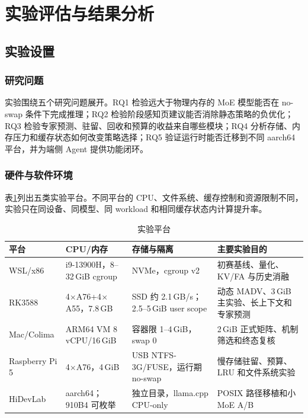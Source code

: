 \section{实验评估与结果分析}
\label{sec:evaluation}

\subsection{实验设置}
\label{sec:protocol}

\subsubsection{研究问题}

实验围绕五个研究问题展开。RQ1 检验远大于物理内存的 MoE 模型能否在 no-swap 条件下完成推理；RQ2 检验阶段感知页建议能否消除静态策略的负优化；RQ3 检验专家预测、驻留、回收和预算的收益来自哪些模块；RQ4 分析存储、内存压力和缓存状态如何改变策略选择；RQ5 验证运行时能否迁移到不同 aarch64 平台，并为端侧 Agent 提供功能闭环。

\subsubsection{硬件与软件环境}

表\ref{tab:eval-platforms}列出五类实验平台。不同平台的 CPU、文件系统、缓存控制和资源限制不同，实验只在同设备、同模型、同 workload 和相同缓存状态内计算提升率。

\begin{table}[H]
  \centering
  \scriptsize
  \caption{实验平台}
  \label{tab:eval-platforms}
  \begin{tabular}{p{}p{}p{}p{}}
    \toprule
    平台 & CPU/内存 & 存储与隔离 & 主要实验目的 \\
    \midrule
    WSL/x86 & i9-13900H，8--32\,GiB cgroup & NVMe，cgroup v2 & 初赛基线、量化、KV/FA 与历史消融 \\
    RK3588 & 4$\times$A76+4$\times$A55，7.8\,GB & SSD 约 2.1\,GB/s；2.5--5\,GiB user scope & 动态 MADV、3\,GiB 主实验、长上下文和专家预测 \\
    Mac/Colima & ARM64 VM 8 vCPU/16\,GiB & 容器限 1--4\,GiB，swap 0 & 2\,GiB 正式矩阵、机制筛选和终态复核 \\
    Raspberry Pi 5 & 4$\times$A76，4\,GiB & USB NTFS-3G/FUSE，运行期 no-swap & 慢存储驻留、预算、LRU 和文件系统实验 \\
    HiDevLab & aarch64；910B4 可枚举 & 独立目录，llama.cpp CPU-only & POSIX 路径移植和小 MoE A/B \\
    \bottomrule
  \end{tabular}
\end{table}

